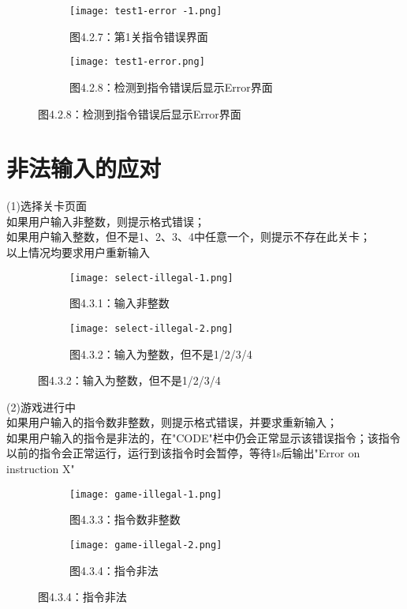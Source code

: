 \documentclass{report}
\begin{document}
    \begin{figure}[htbp]
        \begin{subfigure}[b]{0.45\textwidth}
            \texttt{[image: test1-error -1.png]}
            \caption*{图4.2.7：第1关指令错误界面}
        \end{subfigure}
        \hfill
        \begin{subfigure}[b]{0.45\textwidth}
            \texttt{[image: test1-error.png]}
            \caption*{图4.2.8：检测到指令错误后显示Error界面}
        \end{subfigure}
    \end{figure}\par

    \section{非法输入的应对}
    (1)选择关卡页面\\
    如果用户输入非整数，则提示格式错误；\\
    如果用户输入整数，但不是1、2、3、4中任意一个，则提示不存在此关卡；\\
    以上情况均要求用户重新输入
    \begin{figure}[htbp]
        \begin{subfigure}[b]{0.45\textwidth}
            \texttt{[image: select-illegal-1.png]}
            \caption*{图4.3.1：输入非整数}
        \end{subfigure}
        \hfill
        \begin{subfigure}[b]{0.45\textwidth}
            \texttt{[image: select-illegal-2.png]}
            \caption*{图4.3.2：输入为整数，但不是1/2/3/4}
        \end{subfigure}
    \end{figure}\newpage
    (2)游戏进行中\\
    如果用户输入的指令数非整数，则提示格式错误，并要求重新输入；\\
    如果用户输入的指令是非法的，在"CODE"栏中仍会正常显示该错误指令；该指令以前的指令会正常运行，运行到该指令时会暂停，等待1s后输出"Error on instruction X"
    \begin{figure}[htbp]
        \begin{subfigure}[b]{0.45\textwidth}
            \texttt{[image: game-illegal-1.png]}
            \caption*{图4.3.3：指令数非整数}
        \end{subfigure}
        \hfill
        \begin{subfigure}[b]{0.45\textwidth}
            \texttt{[image: game-illegal-2.png]}
            \caption*{图4.3.4：指令非法}
        \end{subfigure}
    \end{figure}\\
\end{document}
